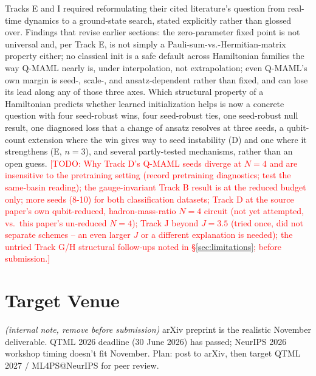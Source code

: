 \documentclass[11pt]{article}
\newcommand{\todo}[1]{\textcolor{red}{[TODO: #1]}}
\begin{document}
Tracks E and I required reformulating their cited literature's question from real-time dynamics to a
ground-state search, stated explicitly rather than glossed over. Findings that
revise earlier sections: the zero-parameter fixed point is not universal and, per Track E, is not simply a
Pauli-sum-vs.-Hermitian-matrix property either; no classical init is a safe default across Hamiltonian
families the way Q-MAML nearly is, under interpolation, not extrapolation; even Q-MAML's own margin is
seed-, scale-, and ansatz-dependent rather than fixed, and can lose its lead along any of those three axes.
Which structural property of a Hamiltonian predicts whether learned initialization helps is now a concrete
question with four seed-robust wins, four seed-robust ties, one seed-robust null result, one diagnosed loss
that a change of ansatz resolves at three seeds, a qubit-count extension where the win gives way to seed
instability (D) and one where it strengthens (E, $n{=}3$), and several partly-tested mechanisms, rather
than an open guess.
\todo{Why Track D's Q-MAML seeds diverge at $N{=}4$ and are insensitive to the pretraining setting (record
pretraining diagnostics; test the same-basin reading); the gauge-invariant Track B result is at the reduced budget only; more seeds (8-10)
for both classification datasets; Track D at the source paper's own qubit-reduced,
hadron-mass-ratio $N{=}4$ circuit (not yet attempted, vs.\ this paper's un-reduced $N{=}4$); Track J beyond
$J{=}3.5$ (tried once, did not separate schemes -- an even larger $J$ or a different explanation is needed);
the untried Track G/H structural follow-ups noted in \S\ref{sec:limitations}; before submission.}

\section*{Target Venue}
\emph{(internal note, remove before submission)} arXiv preprint is the realistic November deliverable.
QTML 2026 deadline (30 June 2026) has passed; NeurIPS 2026 workshop timing doesn't fit November. Plan: post
to arXiv, then target QTML 2027 / ML4PS@NeurIPS for peer review.
\end{document}
